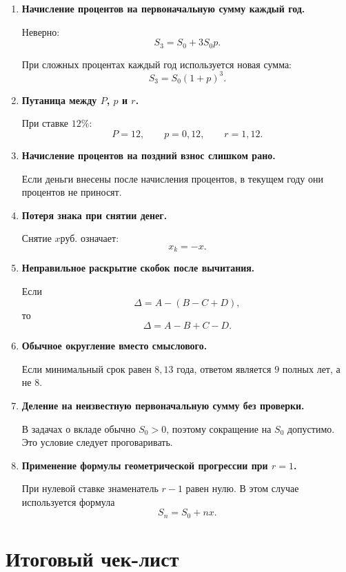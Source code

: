 \documentclass[a4paper,12pt]{article}
\newcommand{\RUB}{\text{руб.}}
\newcommand{\warningtext}[1]{\textbf{\color{warning}#1}}
\begin{document}
\begin{enumerate}
  \item \warningtext{Начисление процентов на первоначальную сумму каждый год.}

  Неверно:
  \[
  S_3=S_0+3S_0p.
  \]

  При сложных процентах каждый год используется новая сумма:
  \[
  S_3=S_0(1+p)^3.
  \]

  \item \warningtext{Путаница между \(P\), \(p\) и \(r\).}

  При ставке \(12\%\):
  \[
  P=12,\qquad p=0{,}12,\qquad r=1{,}12.
  \]

  \item \warningtext{Начисление процентов на поздний взнос слишком рано.}

  Если деньги внесены после начисления процентов, в текущем году они процентов
  не приносят.

  \item \warningtext{Потеря знака при снятии денег.}

  Снятие \(x\RUB\) означает:
  \[
  x_k=-x.
  \]

  \item \warningtext{Неправильное раскрытие скобок после вычитания.}

  Если
  \[
  \Delta=A-(B-C+D),
  \]
  то
  \[
  \Delta=A-B+C-D.
  \]

  \item \warningtext{Обычное округление вместо смыслового.}

  Если минимальный срок равен \(8{,}13\) года, ответом является \(9\) полных
  лет, а не \(8\).

  \item \warningtext{Деление на неизвестную первоначальную сумму без проверки.}

  В задачах о вкладе обычно \(S_0>0\), поэтому сокращение на \(S_0\) допустимо.
  Это условие следует проговаривать.

  \item \warningtext{Применение формулы геометрической прогрессии при \(r=1\).}

  При нулевой ставке знаменатель \(r-1\) равен нулю. В этом случае используется
  формула
  \[
  S_n=S_0+nx.
  \]
\end{enumerate}

\section{Итоговый чек-лист}
\end{document}
